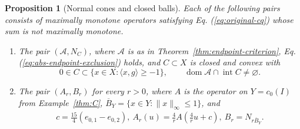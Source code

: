 \documentclass[11pt]{article}
\newcommand{\dom}{\operatorname{dom}}
\newcommand{\pair}[2]{\langle #1,#2\rangle}
\newtheorem{proposition}{Proposition}
\theoremstyle{definition}
\theoremstyle{remark}
\begin{document}
\begin{proposition}[Normal cones and closed balls]
\label{cor:normal-cone}
Each of the following pairs consists of maximally monotone operators satisfying Eq. (\ref{eq:original-cq}) whose sum is not maximally monotone.
\begin{enumerate}
\item\label{cor:nc-general} The pair $(\mathcal A,N_C)$, where $\mathcal A$ is as in Theorem~\ref{thm:endpoint-criterion}, Eq. (\ref{eq:abs-endpoint-exclusion}) holds, and $C\subset X$ is closed and convex with
\begin{equation}
0\in C\subset\{x\in X:\pair{x}{g}\ge-1\},
\qquad
\dom\mathcal A\cap\operatorname{int}C\ne\varnothing.
\label{eq:cor-nc-condition}
\end{equation}
\item\label{cor:nc-ball} The pair $(A_r,B_r)$ for every $r>0$, where $A$ is the operator on $Y=c_0(I)$ from Example~\ref{thm:C}, $\overline B_Y=\{x\in Y:\|x\|_\infty\le1\}$, and
\begin{equation}
\begin{aligned}
c=\frac{15}{4}(e_{0,1}-e_{0,2}),~A_r(u)=\frac4r A\left(\frac4r u+c\right),~B_r=N_{r\overline B_Y}.
\end{aligned}
\label{eq:cor-ball-operators}
\end{equation}
\end{enumerate}
\end{proposition}
\end{document}
